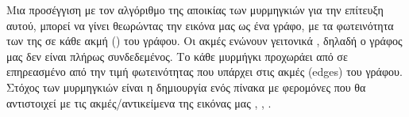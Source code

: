 Μια προσέγγιση με τον αλγόριθμο της αποικίας των μυρμηγκιών για την επίτευξη αυτού, μπορεί να γίνει θεωρώντας την εικόνα μας ως ένα γράφο, με τα φωτεινότητα των  της σε κάθε ακμή () του γράφου. Οι ακμές ενώνουν γειτονικά , δηλαδή ο γράφος μας δεν είναι πλήρως συνδεδεμένος. Το κάθε μυρμήγκι προχωράει από  σε  επηρεασμένο από την τιμή φωτεινότητας που υπάρχει στις ακμές (edges) του γράφου. Στόχος των μυρμηγκιών είναι η δημιουργία ενός πίνακα με φερομόνες που θα αντιστοιχεί με τις ακμές/αντικείμενα της εικόνας μας \cite{baterina2010image}, \cite{nezamabadi2006edge}, \cite{tian2008ant}. 







